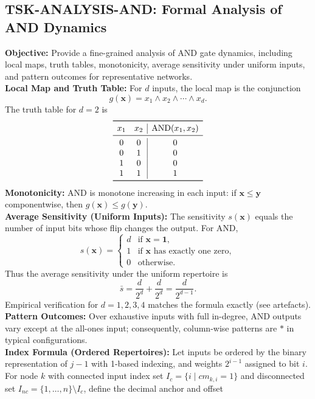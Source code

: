 \documentclass{article}
\begin{document}
\subsection{TSK-ANALYSIS-AND: Formal Analysis of AND Dynamics}
\textbf{Objective:} Provide a fine-grained analysis of AND gate dynamics, including local maps, truth tables, monotonicity, average sensitivity under uniform inputs, and pattern outcomes for representative networks.\\
\textbf{Local Map and Truth Table:} For \(d\) inputs, the local map is the conjunction
\[
g(\mathbf{x}) = x_1 \land x_2 \land \cdots \land x_d.
\]
The truth table for \(d=2\) is
\[
\begin{array}{cc|c}
\toprule
 x_1 & x_2 & \mathrm{AND}(x_1,x_2) \\
\midrule
 0 & 0 & 0 \\
 0 & 1 & 0 \\
 1 & 0 & 0 \\
 1 & 1 & 1 \\
\bottomrule
\end{array}
\]
\textbf{Monotonicity:} AND is monotone increasing in each input: if \(\mathbf{x}\leq \mathbf{y}\) componentwise, then \(g(\mathbf{x})\leq g(\mathbf{y})\).\\
\textbf{Average Sensitivity (Uniform Inputs):} The sensitivity \(s(\mathbf{x})\) equals the number of input bits whose flip changes the output. For AND,
\[
s(\mathbf{x}) = \begin{cases}
 d & \text{if } \mathbf{x}=\mathbf{1},\\
 1 & \text{if } \mathbf{x} \text{ has exactly one zero},\\
 0 & \text{otherwise.}
\end{cases}
\]
Thus the average sensitivity under the uniform repertoire is
\[
\bar{s} = \frac{d}{2^d} + \frac{d}{2^d} = \frac{d}{2^{d-1}}.
\]
Empirical verification for \(d=1,2,3,4\) matches the formula exactly (see artefacts).\\
\textbf{Pattern Outcomes:} Over exhaustive inputs with full in-degree, AND outputs vary except at the all-ones input; consequently, column-wise patterns are \(*\) in typical configurations.\\
\textbf{Index Formula (Ordered Repertoires):} Let inputs be ordered by the binary representation of \(j-1\) with 1-based indexing, and weights \(2^{i-1}\) assigned to bit \(i\). For node \(k\) with connected input index set \(I_c=\{i\mid cm_{k,i}=1\}\) and disconnected set \(I_{nc}=\{1,\dots,n\}\setminus I_c\), define the decimal anchor and offset
\end{document}
